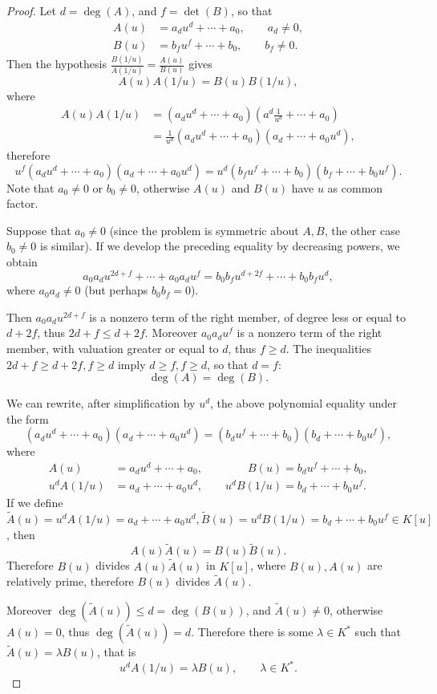 \documentclass[11pt,a4paper]{article}
\begin{document}
\begin{proof} Let $d= \deg(A)$, and $f = \det(B)$, so that
\begin{align*}
A(u) &= a_d u^d+\cdots+a_0,\qquad a_d \ne 0,\\
B(u) &= b_f u^f+\cdots + b_0,\qquad b_f \ne 0.
\end{align*}
Then the hypothesis $\frac{B(1/u)}{A(1/u)} = \frac{A(u)}{B(u)}$ gives
$$A(u)A(1/u) = B(u)B(1/u),$$
where
\begin{align*}
A(u) A(1/u) &= \left(a_d u^d+ \cdots +a_0\right)\left(a^d\frac{1}{u^d}+\cdots + a_0\right)\\
&= \frac{1}{u^d} \left(a_d u^d+ \cdots +a_0\right) \left( a_d+\cdots+a_0u^d\right),
\end{align*}
therefore
$$u^f\left(a_d u^d+ \cdots +a_0\right) \left( a_d+\cdots+a_0u^d\right) = u^d\left(b_f u^f+ \cdots +b_0\right) \left( b_f+\cdots+b_0u^f\right).$$
Note that $a_0 \ne 0$ or $b_0 \ne 0$, otherwise $A(u)$ and $B(u)$ have $u$ as common factor.

Suppose that $a_0 \ne 0$ (since the problem is symmetric about $A,B$, the other case $b_0 \ne 0$ is similar). If we develop the preceding equality by decreasing powers, we obtain
$$a_0a_d u^{2d+f} + \cdots +a_0a_d u^f = b_0b_f u^{d+2f} + \cdots + b_0b_f u^d,$$
where $a_0a_d \ne 0$ (but perhaps $b_0b_f = 0$).

Then $a_0a_d u^{2d+f}$ is a nonzero term of the right member, of degree less or equal to $d+2f$, thus $2d+f \leq d + 2f$. Moreover $a_0a_d u^f$ is a nonzero term of the right member, with valuation greater or equal to $d$, thus $f \geq d$. The inequalities $2d+f \geq d + 2f, f \geq d$ imply $d\geq f, f \geq d$, so that $d=f$:
$$\deg(A) = \deg(B).$$

We can rewrite, after simplification by $u^d$, the above polynomial equality under the form
$$\left(a_d u^d+ \cdots +a_0\right) \left( a_d+\cdots+a_0u^d\right) = \left(b_d u^f+ \cdots +b_0\right) \left( b_d+\cdots+b_0u^f\right),$$
where
\begin{align*}
A(u) &= a_d u^d+ \cdots +a_0,\qquad \qquad B(u) = b_d u^f+ \cdots +b_0,\\
u^dA(1/u) &= a_d+\cdots+a_0u^d,\qquad u^dB(1/u) = b_d+\cdots+b_0u^f.
\end{align*}
If we define $\tilde{A}(u) = u^dA(1/u) = a_d+\cdots+a_0u^d, \tilde{B}(u) = u^dB(1/u) = b_d+\cdots+b_0u^f \in K[u]$, then
$$A(u) \tilde{A}(u) = B(u) \tilde{B}(u).$$
Therefore $B(u)$ divides $A(u)\tilde{A}(u)$ in $K[u]$, where $B(u),A(u)$ are relatively prime, therefore $B(u)$ divides $\tilde{A}(u)$.

Moreover $\deg(\tilde{A}(u)) \leq d = \deg(B(u))$, and $\tilde{A}(u)\ne 0$, otherwise $A(u)=0$, thus $\deg(\tilde{A}(u)) = d$. Therefore there is some $\lambda \in K^*$ such that  $\tilde{A}(u)= \lambda B(u)$, that is
$$u^dA(1/u) = \lambda B(u),\qquad \lambda \in K^*.$$
\end{proof}
\end{document}
